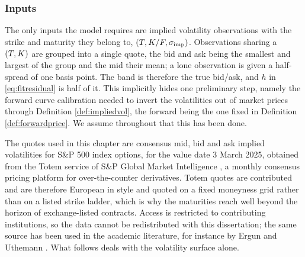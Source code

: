 


\subsubsection*{Inputs}

The only inputs the model requires are implied volatility observations with the strike and maturity
they belong to, $(T,K/F,\sigma_{\mathrm{imp}})$. Observations sharing a $(T,K)$ are grouped into a
single quote, the bid and ask being the smallest and largest of the group and the mid their mean; a
lone observation is given a half-spread of one basis point. The band is therefore the true bid/ask,
and $h$ in \eqref{eq:fitresidual} is half of it.
This implicitly hides one preliminary step, namely the forward curve calibration needed to invert the
volatilities out of market prices through Definition \ref{def:impliedvol}, the forward being the
one fixed in Definition \ref{def:forwardprice}. We assume throughout that this has been done.

The quotes used in this chapter are consensus mid, bid and ask implied volatilities for S\&P 500
index options, for the value date 3 March 2025, obtained from the Totem service of S\&P Global
Market Intelligence \cite{totem}, a monthly consensus pricing platform for over-the-counter
derivatives. Totem quotes are contributed and are therefore European in style and quoted on a fixed
moneyness grid rather than on a listed strike ladder, which is why the maturities reach well beyond
the horizon of exchange-listed contracts. Access is restricted to contributing institutions, so the
data cannot be redistributed with this dissertation; the same source has been used in the academic
literature, for instance by Ergun and Uthemann \cite{ergunuthemann2020}. What follows deals with the volatility surface alone.

